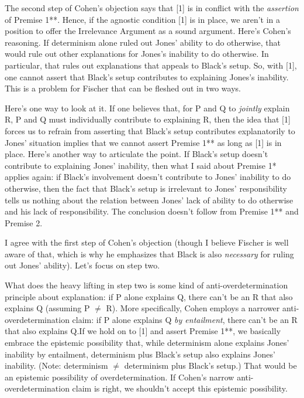 \documentclass[a4paper,12pt]{article}
\begin{document}
The second step of Cohen's objection says that [1] is in conflict with the \emph{assertion} of Premise 1**. Hence, if the agnostic condition [1] is in place, we aren't in a position to offer the Irrelevance Argument as a sound argument. Here's Cohen's reasoning. If determinism alone ruled out Jones' ability to do otherwise, that would rule out other explanations for Jones's inability to do otherwise. In particular, that rules out explanations that appeals to Black's setup. So, with [1], one cannot assert that Black's setup contributes to explaining Jones's inability. This is a problem for Fischer that can be fleshed out in two ways.

Here's one way to look at it. If one believes that, for P and Q to \emph{jointly} explain R, P and Q must individually contribute to explaining R, then the idea that [1] forces us to refrain from asserting that Black's setup contributes explanatorily to Jones' situation implies that we cannot assert Premise 1** as long as [1] is in place. Here's another way to articulate the point. If Black's setup doesn't contribute to explaining Jones' inability, then what I said about Premise 1* applies again: if Black's involvement doesn't contribute to Jones' inability to do otherwise, then the fact that Black's setup is irrelevant to Jones' responsibility tells us nothing about the relation between Jones' lack of ability to do otherwise and his lack of responsibility. The conclusion doesn't follow from Premise 1** and Premise 2.

I agree with the first step of Cohen's objection (though I believe Fischer is well aware of that, which is why he emphasizes that Black is also \emph{necessary} for ruling out Jones' ability). Let's focus on step two.

What does the heavy lifting in step two is some kind of anti-overdetermination principle about explanation: if P alone explains Q, there can't be an R that also explains Q (assuming P $\neq$ R). More specifically, Cohen employs a narrower anti-overdetermination claim: if P alone explains Q \emph{by entailment}, there can't be an R that also explains Q.\footnotemark If we hold on to [1] and assert Premise 1**, we basically embrace the epistemic possibility that, while determinism alone explains Jones' inability by entailment, determinism plus Black's setup also explains Jones' inability. (Note: determinism $\neq$ determinism plus Black's setup.) That would be an epistemic possibility of overdetermination. If Cohen's narrow anti-overdetermination claim is right, we shouldn't accept this epistemic possibility.
\end{document}
